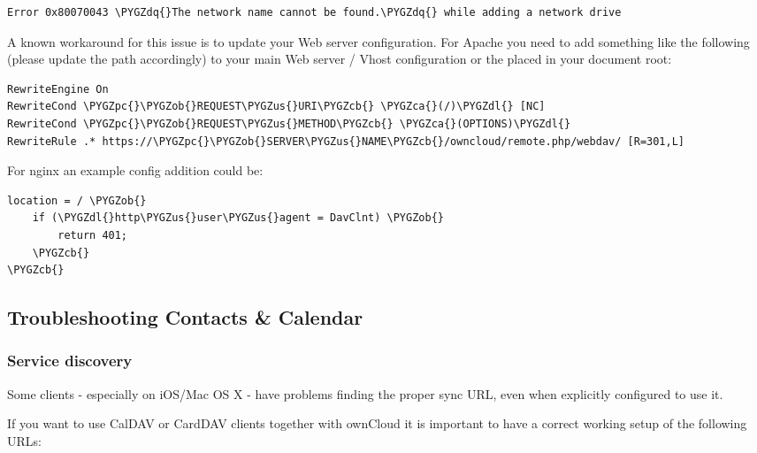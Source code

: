 \documentclass[letterpaper,10pt,english]{sphinxmanual}
\def\PYGZus{\char`\_}
\def\PYGZob{\char`\{}
\def\PYGZcb{\char`\}}
\def\PYGZca{\char`\^}
\def\PYGZpc{\char`\%}
\def\PYGZdl{\char`\$}
\def\PYGZdq{\char`\"}
\begin{document}
\begin{Verbatim}[commandchars=\\\{\}]
Error 0x80070043 \PYGZdq{}The network name cannot be found.\PYGZdq{} while adding a network drive
\end{Verbatim}

A known workaround for this issue is to update your Web server configuration. For Apache
you need to add something like the following (please update the path accordingly) to your
main Web server / Vhost configuration or the  placed in your document root:

\begin{Verbatim}[commandchars=\\\{\}]
RewriteEngine On
RewriteCond \PYGZpc{}\PYGZob{}REQUEST\PYGZus{}URI\PYGZcb{} \PYGZca{}(/)\PYGZdl{} [NC]
RewriteCond \PYGZpc{}\PYGZob{}REQUEST\PYGZus{}METHOD\PYGZcb{} \PYGZca{}(OPTIONS)\PYGZdl{}
RewriteRule .* https://\PYGZpc{}\PYGZob{}SERVER\PYGZus{}NAME\PYGZcb{}/owncloud/remote.php/webdav/ [R=301,L]
\end{Verbatim}

For nginx an example config addition could be:

\begin{Verbatim}[commandchars=\\\{\}]
location = / \PYGZob{}
    if (\PYGZdl{}http\PYGZus{}user\PYGZus{}agent = DavClnt) \PYGZob{}
        return 401;
    \PYGZcb{}
\PYGZcb{}
\end{Verbatim}


\subsection{Troubleshooting Contacts \& Calendar}
\label{issues/general_troubleshooting:troubleshooting-contacts-calendar}

\subsubsection{Service discovery}
\label{issues/general_troubleshooting:service-discovery}\label{issues/general_troubleshooting:service-discovery-label}
Some clients - especially on iOS/Mac OS X - have problems finding the proper
sync URL, even when explicitly configured to use it.

If you want to use CalDAV or CardDAV clients together with ownCloud it is
important to have a correct working setup of the following URLs:

\begin{DUlineblock}{0em}
\item[] 
\item[] 
\item[] 
\end{DUlineblock}
\end{document}
